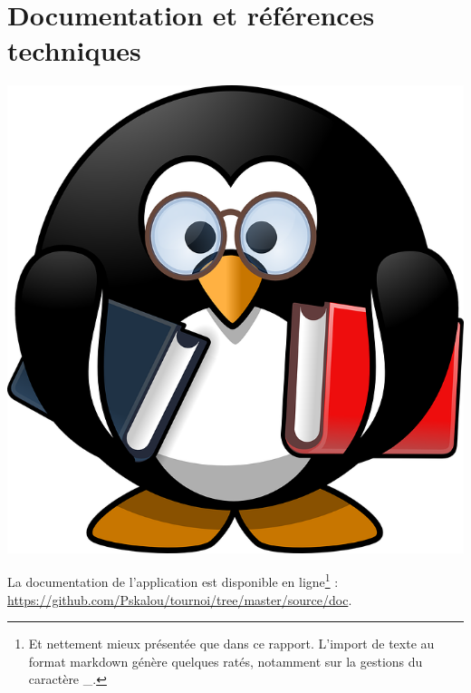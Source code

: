 \documentclass[10pt]{article}
\begin{document}
\newpage
{}
\newpage
{}
\newpage
{}
\newpage
{}



\newpage
\part{Documentation et références techniques}
\vspace*{\fill}
    \begin{center}
        \includegraphics[width=0.5\linewidth]{Doc_tux-161406_960_720.png}
    \end{center}
\vspace*{\fill}
\newpage

La documentation de l'application est disponible en ligne\footnote{Et nettement mieux présentée que dans ce rapport. L'import de texte au format markdown génère quelques ratés, notamment sur la gestions du caractère \_.} : \url{https://github.com/Pskalou/tournoi/tree/master/source/doc}.

\newpage
{}
\newpage
{}
\newpage
{}
\newpage
{}




\newpage
\end{document}
